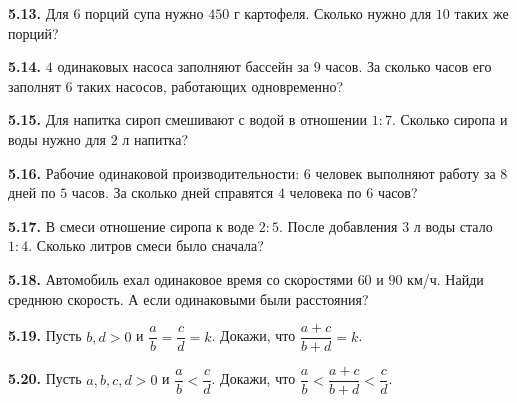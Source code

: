 \noindent\begin{minipage}[t]{\linewidth}\textbf{5.13.} Для \(6\) порций супа нужно \(450\) г картофеля. Сколько нужно для \(10\) таких же порций?\par\end{minipage}\par
\noindent\begin{minipage}[t]{\linewidth}\textbf{5.14.} \(4\) одинаковых насоса заполняют бассейн за \(9\) часов. За сколько часов его заполнят \(6\) таких насосов, работающих одновременно?\par\end{minipage}\par
\noindent\begin{minipage}[t]{\linewidth}\textbf{5.15.} Для напитка сироп смешивают с водой в отношении \(1 : 7\). Сколько сиропа и воды нужно для \(2\) л напитка?\par\end{minipage}\par
\noindent\begin{minipage}[t]{\linewidth}\textbf{5.16.}\starmark{} Рабочие одинаковой производительности: \(6\) человек выполняют работу за \(8\) дней по \(5\) часов. За сколько дней справятся \(4\) человека по \(6\) часов?\par\end{minipage}\par
\noindent\begin{minipage}[t]{\linewidth}\textbf{5.17.}\starmark{} В смеси отношение сиропа к воде \(2 : 5\). После добавления \(3\) л воды стало \(1 : 4\). Сколько литров смеси было сначала?\par\end{minipage}\par
\noindent\begin{minipage}[t]{\linewidth}\textbf{5.18.}\starmark{} Автомобиль ехал одинаковое время со скоростями \(60\) и \(90\) км/ч. Найди среднюю скорость. А если одинаковыми были расстояния?\par\end{minipage}\par
\noindent\begin{minipage}[t]{\linewidth}\textbf{5.19.} Пусть \(b,d>0\) и \(\dfrac ab=\dfrac cd=k\). Докажи, что \(\dfrac{a+c}{b+d}=k\).\par\end{minipage}\par
\noindent\begin{minipage}[t]{\linewidth}\textbf{5.20.}\starmark{} Пусть \(a,b,c,d>0\) и \(\dfrac ab<\dfrac cd\). Докажи, что \(\dfrac ab<\dfrac{a+c}{b+d}<\dfrac cd\).\par\end{minipage}\par
\endgroup
